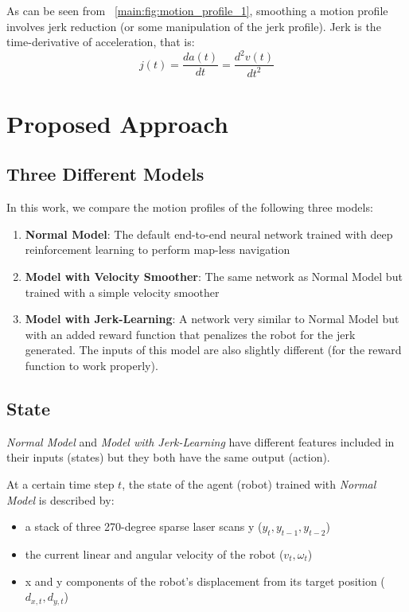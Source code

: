 As can be seen from ~\autoref{main:fig:motion_profile_1}, smoothing a motion profile involves jerk reduction (or some manipulation of the jerk profile). Jerk is the time-derivative of acceleration, that is:
\begin{equation}
j(t) = \frac{da(t)}{dt} = \frac{d^2 v(t)}{dt^2}
\end{equation}

\section{Proposed Approach}
\subsection{Three Different Models}
\label{main:sec:3_models}
In this work, we compare the motion profiles of the following three models:
\begin{enumerate}
\item \textbf{Normal Model}: The default end-to-end neural network trained with deep reinforcement learning to perform map-less navigation
\item \textbf{Model with Velocity Smoother}: The same network as Normal Model but trained with a simple velocity smoother
\item \textbf{Model with Jerk-Learning}: A network very similar to Normal Model but with an added reward function that penalizes the robot for the jerk generated. The inputs of this model are also slightly different (for the reward function to work properly).
\end{enumerate}

\subsection{State}
\label{main:sec:state}
\textit{Normal Model} and \textit{Model with Jerk-Learning} have different features included in their inputs (states) but they both have the same output (action).

At a certain time step $t$, the state of the agent (robot) trained with \textit{Normal Model} is described by:
\begin{itemize}
\item a stack of three 270-degree sparse laser scans y ($y_{t}, y_{t-1}, y_{t-2}$)
\item the current linear and angular velocity of the robot ($v_{t}, \omega_{t}$)
\item x and y components of the robot's displacement from its target position ($d_{x,t}, d_{y,t}$)
\end{itemize}

